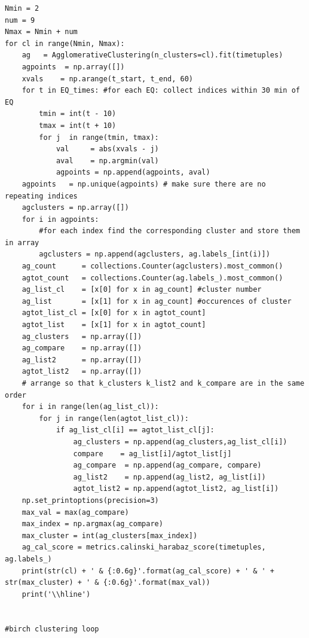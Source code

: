 \documentclass[colorlinks=true,pdfstartview=FitV,linkcolor=blue,
            citecolor=red,urlcolor=magenta]{ligodoc}
\begin{document}
\begin{verbatim}
Nmin = 2
num = 9
Nmax = Nmin + num  
for cl in range(Nmin, Nmax):
    ag   = AgglomerativeClustering(n_clusters=cl).fit(timetuples)
    agpoints  = np.array([])
    xvals    = np.arange(t_start, t_end, 60)
    for t in EQ_times: #for each EQ: collect indices within 30 min of EQ
        tmin = int(t - 10)
        tmax = int(t + 10)
        for j  in range(tmin, tmax):
            val     = abs(xvals - j)
            aval    = np.argmin(val)
            agpoints = np.append(agpoints, aval)
    agpoints   = np.unique(agpoints) # make sure there are no repeating indices
    agclusters = np.array([])
    for i in agpoints:
        #for each index find the corresponding cluster and store them in array
        agclusters = np.append(agclusters, ag.labels_[int(i)])
    ag_count      = collections.Counter(agclusters).most_common()
    agtot_count   = collections.Counter(ag.labels_).most_common()
    ag_list_cl    = [x[0] for x in ag_count] #cluster number
    ag_list       = [x[1] for x in ag_count] #occurences of cluster
    agtot_list_cl = [x[0] for x in agtot_count]
    agtot_list    = [x[1] for x in agtot_count]
    ag_clusters   = np.array([])
    ag_compare    = np.array([])
    ag_list2      = np.array([])
    agtot_list2   = np.array([])
    # arrange so that k_clusters k_list2 and k_compare are in the same order
    for i in range(len(ag_list_cl)):
        for j in range(len(agtot_list_cl)):
            if ag_list_cl[i] == agtot_list_cl[j]:
                ag_clusters = np.append(ag_clusters,ag_list_cl[i])
                compare    = ag_list[i]/agtot_list[j]
                ag_compare  = np.append(ag_compare, compare)
                ag_list2    = np.append(ag_list2, ag_list[i])
                agtot_list2 = np.append(agtot_list2, ag_list[i])
    np.set_printoptions(precision=3)
    max_val = max(ag_compare)
    max_index = np.argmax(ag_compare)
    max_cluster = int(ag_clusters[max_index])
    ag_cal_score = metrics.calinski_harabaz_score(timetuples, ag.labels_)
    print(str(cl) + ' & {:0.6g}'.format(ag_cal_score) + ' & ' + str(max_cluster) + ' & {:0.6g}'.format(max_val))
    print('\\hline')


#birch clustering loop


\end{verbatim}
\end{document}
